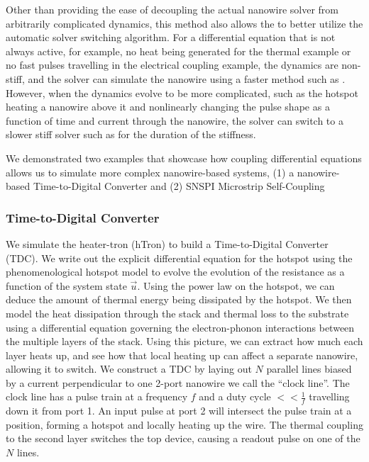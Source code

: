 Other than providing the ease of decoupling the actual nanowire solver from arbitrarily complicated
dynamics, this method also allows the  to better utilize the automatic solver
switching algorithm. For a differential equation that is not always active, for example, no heat being generated for the thermal example or no fast pulses travelling in the electrical coupling example,
the dynamics are non-stiff, and the solver can simulate the nanowire using a faster method such as
. However, when the dynamics evolve to be more complicated, such as the hotspot heating a nanowire
above it and nonlinearly changing the pulse shape as a function of time and current through the nanowire,
the solver can switch to a slower stiff solver such as  for the duration of the stiffness.

We demonstrated two examples that showcase how coupling differential equations allows us
to simulate more complex nanowire-based systems, (1) a nanowire-based Time-to-Digital Converter
and (2) SNSPI Microstrip Self-Coupling

\subsubsection{Time-to-Digital Converter}

We simulate the heater-tron (hTron) to build a Time-to-Digital Converter
(TDC). We write out the explicit differential equation for the hotspot using the phenomenological
hotspot model to evolve the evolution of the resistance as a function of the system state $\vec u$. 
Using the power law on the hotspot, we can deduce the amount of thermal energy being dissipated
by the hotspot. We then model the heat dissipation through the stack and thermal loss to the substrate
using a differential equation governing the electron-phonon interactions between the 
multiple layers of the stack.
Using this picture, we can extract how much each layer heats up, and see how that local 
heating up can affect
a separate nanowire, allowing it to switch. We construct a TDC by laying out $N$ parallel 
lines biased by a current perpendicular to one 2-port nanowire we call the ``clock line''. 
The clock line has a pulse train at a frequency $f$ and a duty cycle 
$<<\frac{1}{f}$ travelling down it from port 1. An input pulse at port 2 will intersect the pulse train 
at a position, forming a hotspot and locally heating up the wire. The thermal coupling to the second
layer switches the top device, causing a readout pulse on one of the $N$ lines. 

